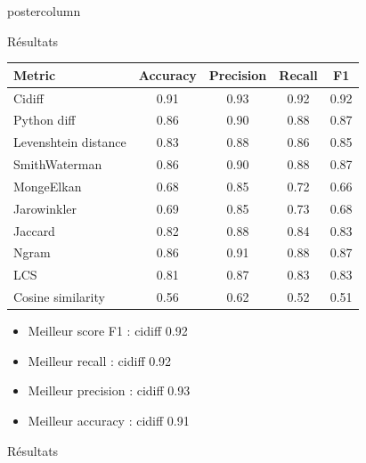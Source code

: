 \begin{frame}
\begin{columns}
\begin{column}{.49\textwidth}
\begin{beamercolorbox}[center,wd=\textwidth]{postercolumn}
\begin{minipage}[T]{.95\textwidth}
{\begin{block}{Résultats}
              \centering
              \begin{tabular}{|l|c|c|c|c|}
                \hline
                \textbf{Metric} & \textbf{Accuracy} & \textbf{Precision} & \textbf{Recall} & \textbf{F1} \\
                \hline
                Cidiff & 0.91 & 0.93 & 0.92 & 0.92 \\
                Python diff & 0.86 & 0.90 & 0.88 & 0.87 \\
                Levenshtein distance & 0.83 & 0.88 & 0.86 & 0.85 \\
                SmithWaterman & 0.86 & 0.90 & 0.88 & 0.87 \\
                MongeElkan & 0.68 & 0.85 & 0.72 & 0.66 \\
                Jarowinkler & 0.69 & 0.85 & 0.73 & 0.68 \\
                Jaccard & 0.82 & 0.88 & 0.84 & 0.83 \\
                Ngram & 0.86 & 0.91 & 0.88 & 0.87 \\
                LCS & 0.81 & 0.87 & 0.83 & 0.83 \\
                Cosine similarity & 0.56 & 0.62 & 0.52 & 0.51 \\
                \hline
              \end{tabular}
              
              \begin{itemize}
              \item Meilleur score F1 :  cidiff 0.92
              \item Meilleur recall :  cidiff 0.92
              \item Meilleur precision :  cidiff 0.93
              \item Meilleur accuracy :  cidiff 0.91
              \end{itemize}
            
            \end{block}
            
            \vfill
            
            \begin{block}{Résultats}
              

\end{block}}
\end{minipage}
\end{beamercolorbox}
\end{column}
\end{columns}
\end{frame}
